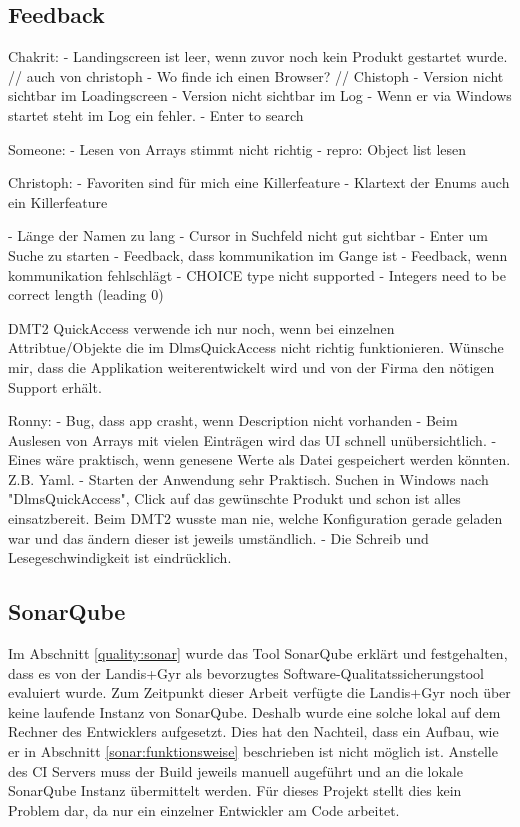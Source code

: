 \subsection{Feedback}
Chakrit: 
- Landingscreen ist leer, wenn zuvor noch kein Produkt gestartet wurde. // auch von christoph
   - Wo finde ich einen Browser? // Chistoph
- Version nicht sichtbar im Loadingscreen
- Version nicht sichtbar im Log
- Wenn er via Windows startet steht im Log ein fehler.
- Enter to search

Someone:
- Lesen von Arrays stimmt nicht richtig
   - repro: Object list lesen

Christoph:
- Favoriten sind für mich eine Killerfeature
- Klartext der Enums auch ein Killerfeature

- Länge der Namen zu lang
- Cursor in Suchfeld nicht gut sichtbar
- Enter um Suche zu starten
- Feedback, dass kommunikation im Gange ist
- Feedback, wenn kommunikation fehlschlägt
- CHOICE type nicht supported
- Integers need to be correct length (leading 0)

DMT2 QuickAccess verwende ich nur noch, wenn bei einzelnen Attribtue/Objekte die im DlmsQuickAccess nicht richtig funktionieren.
   Wünsche mir, dass die Applikation weiterentwickelt wird und von der Firma den nötigen Support erhält.



Ronny:
- Bug, dass app crasht, wenn Description nicht vorhanden
- Beim Auslesen von Arrays mit vielen Einträgen wird das UI schnell unübersichtlich.
- Eines wäre praktisch, wenn genesene Werte als Datei gespeichert werden könnten. Z.B. Yaml.
- Starten der Anwendung sehr Praktisch. Suchen in Windows nach "DlmsQuickAccess", Click auf das gewünschte Produkt und schon ist alles einsatzbereit.
Beim DMT2 wusste man nie, welche Konfiguration gerade geladen war und das ändern dieser ist jeweils umständlich.
- Die Schreib und Lesegeschwindigkeit ist eindrücklich.





\subsection{SonarQube}\label{s6:sonar}
Im Abschnitt \ref{quality:sonar} wurde das Tool SonarQube erklärt und festgehalten, dass es von der Landis+Gyr als bevorzugtes Software-Qualitatssicherungstool evaluiert wurde.
Zum Zeitpunkt dieser Arbeit verfügte die Landis+Gyr noch über keine laufende Instanz von SonarQube.
Deshalb wurde eine solche lokal auf dem Rechner des Entwicklers aufgesetzt.
Dies hat den Nachteil, dass ein Aufbau, wie er in Abschnitt \ref{sonar:funktionsweise} beschrieben ist nicht möglich ist.
Anstelle des \ac{CI} Servers muss der Build jeweils manuell augeführt und an die lokale SonarQube Instanz übermittelt werden.
Für dieses Projekt stellt dies kein Problem dar, da nur ein einzelner Entwickler am Code arbeitet.




